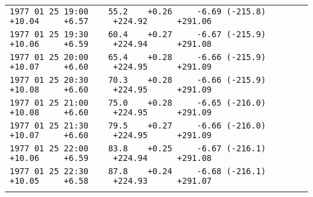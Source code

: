 \begin{center}
\begin{tabular}{|l|}
\verb|1977 01 25 19:00    55.2    +0.26     -6.69 (-215.8)     +10.04     +6.57     +224.92      +291.06|\\
\verb|1977 01 25 19:30    60.4    +0.27     -6.67 (-215.9)     +10.06     +6.59     +224.94      +291.08|\\
\verb|1977 01 25 20:00    65.4    +0.28     -6.66 (-215.9)     +10.07     +6.60     +224.95      +291.09|\\
\verb|1977 01 25 20:30    70.3    +0.28     -6.66 (-215.9)     +10.08     +6.60     +224.95      +291.09|\\
\verb|1977 01 25 21:00    75.0    +0.28     -6.65 (-216.0)     +10.08     +6.60     +224.95      +291.09|\\
\verb|1977 01 25 21:30    79.5    +0.27     -6.66 (-216.0)     +10.07     +6.60     +224.95      +291.09|\\
\verb|1977 01 25 22:00    83.8    +0.25     -6.67 (-216.1)     +10.06     +6.59     +224.94      +291.08|\\
\verb|1977 01 25 22:30    87.8    +0.24     -6.68 (-216.1)     +10.05     +6.58     +224.93      +291.07|\\
\\
\hline
\end{tabular}

\end{center}
\latex{\end{tiny}}


